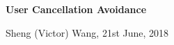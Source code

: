 \begin{center}
\Large{{\bf 
User Cancellation Avoidance}}
\end{center}

\begin{center}
Sheng (Victor) Wang, 21st June, 2018
\end{center}